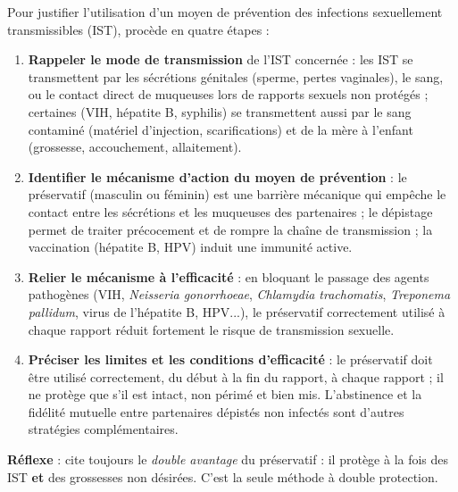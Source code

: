 \documentclass[11pt]{article}
\newcommand{\cle}[1]{{\popxbold\color{popdark}#1}}
\begin{document}
\begin{methode}
Pour justifier l'utilisation d'un moyen de prévention des infections sexuellement transmissibles (IST), procède en quatre étapes :
\begin{enumerate}
\item \textbf{Rappeler le mode de transmission} de l'IST concernée : les IST se transmettent par les sécrétions génitales (sperme, pertes vaginales), le sang, ou le contact direct de muqueuses lors de rapports sexuels non protégés ; certaines (VIH, hépatite B, syphilis) se transmettent aussi par le sang contaminé (matériel d'injection, scarifications) et de la mère à l'enfant (grossesse, accouchement, allaitement).
\item \textbf{Identifier le mécanisme d'action du moyen de prévention} : le préservatif (masculin ou féminin) est une \cle{barrière mécanique} qui empêche le contact entre les sécrétions et les muqueuses des partenaires ; le dépistage permet de traiter précocement et de rompre la chaîne de transmission ; la vaccination (hépatite B, HPV) induit une immunité active.
\item \textbf{Relier le mécanisme à l'efficacité} : en bloquant le passage des agents pathogènes (VIH, \emph{Neisseria gonorrhoeae}, \emph{Chlamydia trachomatis}, \emph{Treponema pallidum}, virus de l'hépatite B, HPV...), le préservatif correctement utilisé à chaque rapport réduit fortement le risque de transmission sexuelle.
\item \textbf{Préciser les limites et les conditions d'efficacité} : le préservatif doit être utilisé correctement, du début à la fin du rapport, à chaque rapport ; il ne protège que s'il est intact, non périmé et bien mis. L'abstinence et la fidélité mutuelle entre partenaires dépistés non infectés sont d'autres stratégies complémentaires.
\end{enumerate}
\textbf{Réflexe} : cite toujours le \emph{double avantage} du préservatif : il protège à la fois des IST \textbf{et} des grossesses non désirées. C'est la seule méthode à double protection.
\end{methode}
\end{document}
